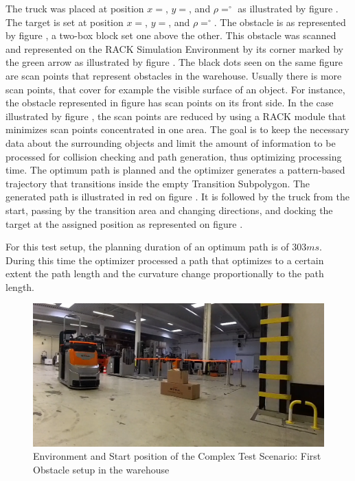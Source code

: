 The truck was placed at position \(x = \), \(y = \), and \(\rho = ^\circ\) as illustrated by figure 
. The target is set at position \(x = \), \(y = \), and \(\rho = ^\circ\).
The obstacle is as represented by figure , a two-box block set one above the other. 
This obstacle was scanned and represented on the RACK Simulation 
Environment by its corner marked by the green arrow as illustrated by figure .
The black dots seen on the same figure are scan points that represent obstacles in the warehouse. 
Usually there is more scan points, that cover for example the visible surface of an object.
For instance, the obstacle represented in figure  has scan points on its front side.
In the case illustrated by figure , the scan points are reduced by using a RACK module 
that minimizes scan points concentrated in one area. The goal is to keep the necessary data about the surrounding 
objects and limit the amount of information to be processed 
for collision checking and path generation, thus optimizing processing time.
The optimum path is planned and the optimizer generates a pattern-based trajectory that transitions
inside the empty Transition Subpolygon. 
The generated path is illustrated in red on figure . It is followed 
by the truck from the start, passing by the transition area and changing directions, and docking the 
target at the assigned position as represented on figure . 

For this test setup, the planning duration of an optimum path is of \(303ms\). During this time
the optimizer processed a path that optimizes to a certain extent the path length and 
the curvature change proportionally to the path length.


\begin{figure}[H]
    \begin{center}
        \includegraphics[width=5in]{images/Chap3/Test2_ObsLeftVehic/Start_real.png} %
        \caption{Environment and Start position of the Complex Test Scenario: First Obstacle setup in the warehouse}
        \label{OptResult12}
        \end{center}    
\end{figure}

